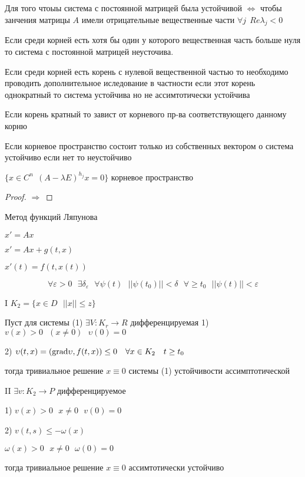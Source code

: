 \begin{block}
  Для того чтоыы система с постоянной матрицей была устойчивой
  $\Leftrightarrow$ чтобы занчения матрицы $A$ имели отрицательные вещественные
  части $\forall j ~~ Re \lambda_j < 0$
\end{block}

\begin{block}
  Если среди корней есть хотя бы один у которого вещественная часть больше нуля
  то система с постоянной матрицей неусточива.
\end{block}

Если среди корней есть корень с нулевой вещественной частью то необходимо
проводить дополнительное иследование в частности если этот корень однократный
то система устойчива но не ассимтотически устойчива

Если корень кратный то завист от корневого пр-ва соответствующего данному корню

Если корневое пространство состоит только из собственных вектором о система
устойчиво если нет то неустойчиво

$\{x \in C^n ~~ (A - \lambda E)^{h_j} x = 0 \}$ корневое пространство

\begin{proof}
  $\Rightarrow$
\end{proof}

\begin{title}[\Large]
  Метод функций Ляпунова
\end{title}

\begin{define}
  $x' = Ax$

  $x' = Ax + g(t,x)$

  $x'(t) = f(t,x(t))$
\end{define}

\begin{define}
  $$
  \forall \varepsilon > 0
  ~~~
  \exists \delta_{\varepsilon}
  ~~~
  \forall \psi(t)
  ~~~
  ||\psi(t_0)|| < \delta
  ~~~
  \forall \ge t_0
  ~~~
  ||\psi(t)|| < \varepsilon
  $$
\end{define}

\begin{theorem}
  I $K_2 = \{x \in D ~~~ ||x|| \le z\}$

  Пуст для системы (1) $\exists V: K_r \to R$ дифференцируемая
  1) $v(x) > 0 ~~~ (x \not= 0) ~~~ \upsilon(0) = 0$

  2) $\upsilon(t,x) = (\mathrm{grad} \upsilon, f(t,x)) \le 0 ~~~ \forall x \in K_2 ~~~
  t \ge t_0$

  тогда тривиальное решение $x \equiv 0$ системы (1) устойчивости
  ассимптотической

  II $\exists v: K_2 \to P$ дифференцируемое

  1) $v(x) > 0 ~~~ x \not= 0 ~~~ v(0) = 0$

  2) $v(t,s) \le - \omega(x)$

  $\omega(x) > 0 ~~~ x \not= 0 ~~~ \omega(0) = 0$

  тогда тривиальное решение $x \equiv 0$ ассимтотически устойчиво
\end{theorem}
